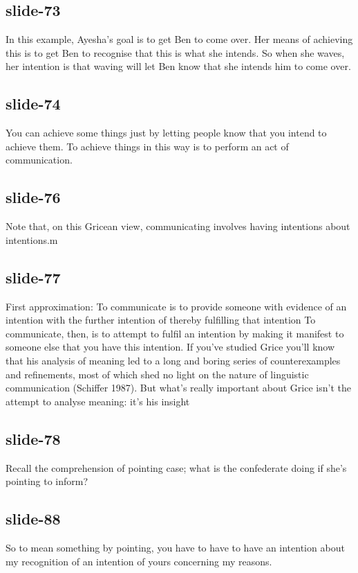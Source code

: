 \documentclass[12pt,\papersize]{extarticle}
\begin{document}
 
\subsection{slide-73}
In this example, Ayesha’s goal is to get Ben to come over. Her means of achieving this is to get Ben to recognise that this is what she intends. So when she waves, her intention is that waving will let Ben know that she intends him to come over.
 
 
\subsection{slide-74}
You can achieve some things just by letting people know that you intend to achieve them. To achieve things in this way is to perform an act of communication.
 
 
\subsection{slide-76}
Note that, on this Gricean view, communicating involves having intentions about intentions.m
 
 
\subsection{slide-77}
First approximation: To communicate is to provide someone with evidence of an intention with the further intention of thereby fulfilling that intention
To communicate, then, is to attempt to fulfil an intention by making it manifest to someone else that you have this intention. If you’ve studied Grice you’ll know that his analysis of meaning led to a long and boring series of counterexamples and refinements, most of which shed no light on the nature of linguistic communication (Schiffer 1987). But what’s really important about Grice isn’t the attempt to analyse meaning: it’s his insight
 
 
\subsection{slide-78}
Recall the comprehension of pointing case; what is the confederate doing if she's pointing to inform?
 
 
\subsection{slide-88}
So to mean something by pointing, you have to have to have an intention about my recognition of an intention of yours concerning my reasons.
 
\end{document}
